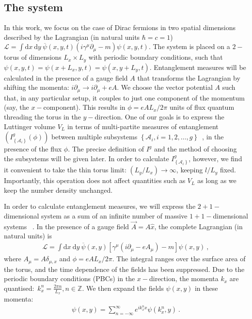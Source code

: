 \subsection{The system}
In this work, we focus on the case of Dirac fermions in two spatial dimensions described by the Lagrangian (in natural units \(\hbar=c=1\)) \(\mathcal{L} = \int \mathrm{d}x~\mathrm{d}y~\overline\psi(x,y,t)\left(i\gamma^\mu\partial_\mu - m\right)\psi(x,y,t)\). The system is placed on a \(2-\)torus of dimensions \(L_x\times L_y\) with periodic boundary conditions, such that \(\psi(x,y,t) = \psi(x+L_x,y,t) = \psi(x,y+L_y,t)\). Entanglement measures will be calculated in the presence of a gauge field \(A\) that transforms the Lagrangian by shifting the momenta: \(i\partial_\mu \to i\partial_\mu + eA\). We choose the vector potential $A$ such that, in any particular setup, it couples to just one component of the momentum (say, the \(x-\)component). This results in \(\phi=eAL_x/2\pi\) units of flux quantum threading the torus in the \(y-\)direction. One of our goals is to express the Luttinger volume \(V_L\) in terms of multi-partite measures of entanglement \(\left( I^g_{\left\{ \mathcal{A}_i \right\} }(\phi) \right)\) between multiple subsystems \(\left\{\mathcal{A}_i, i=1,2,\ldots,g\right\}\)~\cite{siddhartha_TEE}, in the presence of the flux \(\phi\).
The precise definition of \(I^g\) and the method of choosing the subsystems will be given later.
In order to calculate \(I^g_{\left\{\mathcal{A}_i\right\}}\), however, we find it convenient to take the thin torus limit: \(\left( L_y/L_x \right) \to \infty\), keeping \(l/L_y\) fixed. Importantly, this operation does not affect quantities such as \(V_L\) as long as we keep the number density unchanged.

In order to calculate entanglement measures, we will express the \(2+1-\)dimensional system as a sum of an infinite number of massive \(1+1-\)dimensional systems
~\cite{chung_2000,Arias_2015,Chen_2017,Murciano_2020}. In the presence of a gauge field \(\vec A = A \hat x\), the complete Lagrangian (in natural units) is
\begin{equation}\begin{aligned}
	\label{lagrangian}
	\mathcal{L} = \int \mathrm{d}x~\mathrm{d}y~\overline\psi(x,y)\left[\gamma^\mu\left(i\partial_\mu - eA_\mu\right) -m \right]\psi(x,y)~,
\end{aligned}\end{equation}
where \(A_\mu = A \delta_{\mu,x}\) and \(\phi = eAL_x/2\pi\). The integral ranges over the surface area of the torus, and the time dependence of the fields has been suppressed. Due to the periodic boundary conditions (PBCs) in the \(x-\)direction, the momenta \(k_x\) are quantised:~\( k_x^n = \frac{2\pi n}{L_x}, n \in \mathbb{Z}\). We then expand the fields \(\psi(x,y)\) in these momenta: 
\begin{equation}\begin{aligned}
\psi(x,y) = \sum_{n=-\infty}^{\infty} e^{ik_x^n x} \psi(k_x^n,y)~.
\end{aligned}\end{equation}

